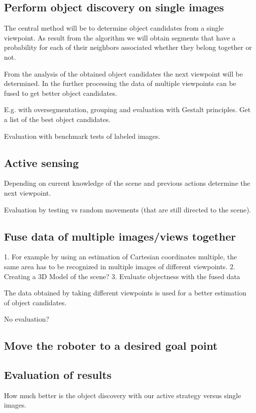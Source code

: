 \documentclass[a4paper,11pt,english]{article}
\begin{document}
\subsection{Perform object discovery on single images}
The central method will be to determine object candidates from a single viewpoint.
As result from the algorithm we will obtain segments that have a probability for each of their neighbors associated whether they belong together or not. 

From the analysis of the obtained object candidates the next viewpoint will be determined.
In the further processing the data of multiple viewpoints can be fused to get better object candidates.


E.g. with oversegmentation, grouping and evaluation with Gestalt principles. Get a list of the best object candidates.



Evaluation with benchmark tests of labeled images.

\subsection{Active sensing}
Depending on current knowledge of the scene and previous actions determine the next viewpoint.

Evaluation by testing vs random movements (that are still directed to the scene).

\subsection{Fuse data of multiple images/views together}
1. For example by using an estimation of Cartesian coordinates multiple, the same area has to be recognized in multiple images of different viewpoints.
2. Creating a 3D Model of the scene?
3. Evaluate objectness with the fused data

The data obtained by taking different viewpoints is used for a better estimation of object candidates.

No evaluation?

\subsection{Move the roboter to a desired goal point}

\subsection{Evaluation of results}
How much better is the object discovery with our active strategy versus single images.
\end{document}

